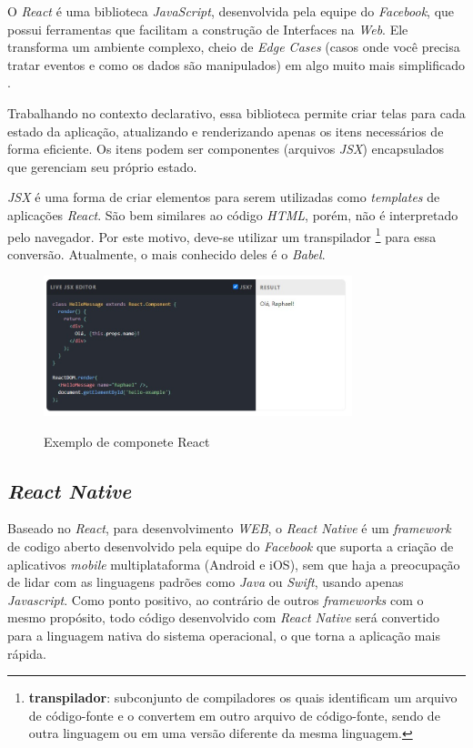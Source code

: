 O \textit{React} é uma biblioteca \textit{JavaScript}, desenvolvida pela equipe do \textit{Facebook}, que possui ferramentas que facilitam a construção de Interfaces na \textit{Web}. Ele transforma um ambiente complexo, cheio de \textit{Edge Cases} (casos onde você precisa tratar eventos e como os dados são manipulados) em algo muito mais simplificado \cite{React}.

Trabalhando no contexto declarativo, essa biblioteca permite criar telas para cada estado da aplicação, atualizando e renderizando apenas os itens necessários de forma eficiente. Os itens podem ser componentes (arquivos \textit{JSX}) encapsulados que gerenciam seu próprio estado.

\textit{JSX} é uma forma de criar elementos para serem utilizadas como \textit{templates} de aplicações \textit{React}. São bem similares ao código \textit{HTML}, porém, não é interpretado pelo navegador. Por este motivo, deve-se utilizar um transpilador \footnote{\textbf{transpilador}: subconjunto de compiladores os quais identificam um arquivo de código-fonte e o convertem em outro arquivo de código-fonte, sendo de outra linguagem ou em uma versão diferente da mesma linguagem.} para essa conversão. Atualmente, o mais conhecido deles é o \textit{Babel}.

\begin{figure}[H]
	\centering
	\caption{Exemplo de componete React}
	\includegraphics[width=0.8\textwidth]{figuras/exemplo_react.jpg}
	\label{fig:react_code}
\end{figure} 


\subsection{\textit{React Native}}

Baseado no \textit{React}, para desenvolvimento \textit{WEB}, o \textit{React Native} é um \textit{framework} de codigo aberto desenvolvido pela equipe do \textit{Facebook} que suporta a criação de aplicativos \textit{mobile} multiplataforma (Android e iOS), sem que haja a preocupação de lidar com as linguagens padrões como \textit{Java} ou \textit{Swift}, usando apenas \textit{Javascript}. Como ponto positivo, ao contrário de outros \textit{frameworks} com o mesmo propósito, todo código desenvolvido com \textit{React Native} será convertido para a linguagem nativa do sistema operacional, o que torna a aplicação mais rápida.

